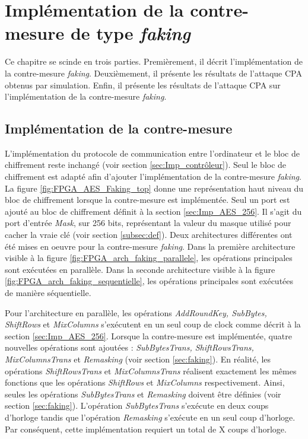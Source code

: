 \documentclass[oneside]{book}
\begin{document}
\newpage


\chapter{Implémentation de la contre-mesure de type \textit{faking}}
\label{chap:faking}

Ce chapitre se scinde en trois parties. Premièrement, il décrit l'implémentation de la contre-mesure \textit{faking}. Deuxièmement, il présente les résultats de l'attaque CPA obtenus par simulation. Enfin, il présente les résultats de l'attaque CPA sur l'implémentation de la contre-mesure \textit{faking}. 

\section{Implémentation de la contre-mesure}
\label{sec:implementation_faking}

L'implémentation du protocole de communication entre l'ordinateur et le bloc de chiffrement reste inchangé (voir section \ref{sec:Imp_contrôleur}). Seul le bloc de chiffrement est adapté afin d'ajouter l'implémentation de la contre-mesure \textit{faking}. La figure \ref{fig:FPGA_AES_Faking_top} donne une représentation haut niveau du bloc de chiffrement lorsque la contre-mesure est implémentée. Seul un port est ajouté au bloc de chiffrement définit à la section \ref{sec:Imp_AES_256}. Il s'agit du port d'entrée \textit{Mask}, sur 256 bits, représentant la valeur du masque utilisé pour cacher la vraie clé (voir section \ref{subsec:def}). Deux architectures différentes ont été mises en oeuvre pour la contre-mesure \textit{faking}. Dans la première architecture visible à la figure \ref{fig:FPGA_arch_faking_parallele}, les opérations principales sont exécutées en parallèle. Dans la seconde architecture visible à la figure \ref{fig:FPGA_arch_faking_sequentielle}, les opérations principales sont exécutées de manière séquentielle.

Pour l'architecture en parallèle, les opérations \textit{AddRoundKey, SubBytes, ShiftRows} et \textit{MixColumns} s'exécutent en un seul coup de clock comme décrit à la section \ref{sec:Imp_AES_256}. Lorsque la contre-mesure est implémentée, quatre nouvelles opérations sont ajoutées : \textit{SubBytesTrans, ShiftRowsTrans, MixColumnsTrans} et \textit{Remasking} (voir section \ref{sec:faking}). En réalité, les opérations \textit{ShiftRowsTrans} et \textit{MixColumnsTrans} réalisent exactement les mêmes fonctions que les opérations \textit{ShiftRows} et \textit{MixColumns} respectivement. Ainsi, seules les opérations \textit{SubBytesTrans} et \textit{Remasking} doivent être définies (voir section \ref{sec:faking}). L'opération \textit{SubBytesTrans} s'exécute en deux coups d'horloge tandis que l'opération \textit{Remasking} s'exécute en un seul coup d'horloge. Par conséquent, cette implémentation requiert un total de X coups d'horloge.
\end{document}
